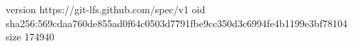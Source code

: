 version https://git-lfs.github.com/spec/v1
oid sha256:569cdaa760de855ad0f64c0503d7791fbe9cc350d3c6994fe4b1199e3bf78104
size 174940
